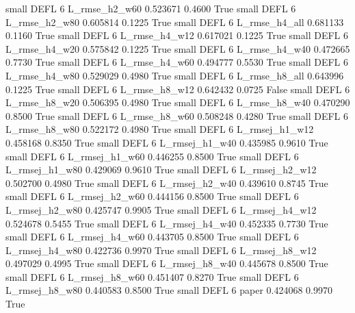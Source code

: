      small     DEFL                 6  L_rmse_h2_w60   0.523671      0.4600    True
     small     DEFL                 6  L_rmse_h2_w80   0.605814      0.1225    True
     small     DEFL                 6  L_rmse_h4_all   0.681133      0.1160    True
     small     DEFL                 6  L_rmse_h4_w12   0.617021      0.1225    True
     small     DEFL                 6  L_rmse_h4_w20   0.575842      0.1225    True
     small     DEFL                 6  L_rmse_h4_w40   0.472665      0.7730    True
     small     DEFL                 6  L_rmse_h4_w60   0.494777      0.5530    True
     small     DEFL                 6  L_rmse_h4_w80   0.529029      0.4980    True
     small     DEFL                 6  L_rmse_h8_all   0.643996      0.1225    True
     small     DEFL                 6  L_rmse_h8_w12   0.642432      0.0725   False
     small     DEFL                 6  L_rmse_h8_w20   0.506395      0.4980    True
     small     DEFL                 6  L_rmse_h8_w40   0.470290      0.8500    True
     small     DEFL                 6  L_rmse_h8_w60   0.508248      0.4280    True
     small     DEFL                 6  L_rmse_h8_w80   0.522172      0.4980    True
     small     DEFL                 6 L_rmsej_h1_w12   0.458168      0.8350    True
     small     DEFL                 6 L_rmsej_h1_w40   0.435985      0.9610    True
     small     DEFL                 6 L_rmsej_h1_w60   0.446255      0.8500    True
     small     DEFL                 6 L_rmsej_h1_w80   0.429069      0.9610    True
     small     DEFL                 6 L_rmsej_h2_w12   0.502700      0.4980    True
     small     DEFL                 6 L_rmsej_h2_w40   0.439610      0.8745    True
     small     DEFL                 6 L_rmsej_h2_w60   0.444156      0.8500    True
     small     DEFL                 6 L_rmsej_h2_w80   0.425747      0.9905    True
     small     DEFL                 6 L_rmsej_h4_w12   0.524678      0.5455    True
     small     DEFL                 6 L_rmsej_h4_w40   0.452335      0.7730    True
     small     DEFL                 6 L_rmsej_h4_w60   0.443705      0.8500    True
     small     DEFL                 6 L_rmsej_h4_w80   0.422736      0.9970    True
     small     DEFL                 6 L_rmsej_h8_w12   0.497029      0.4995    True
     small     DEFL                 6 L_rmsej_h8_w40   0.445678      0.8500    True
     small     DEFL                 6 L_rmsej_h8_w60   0.451407      0.8270    True
     small     DEFL                 6 L_rmsej_h8_w80   0.440583      0.8500    True
     small     DEFL                 6          paper   0.424068      0.9970    True
